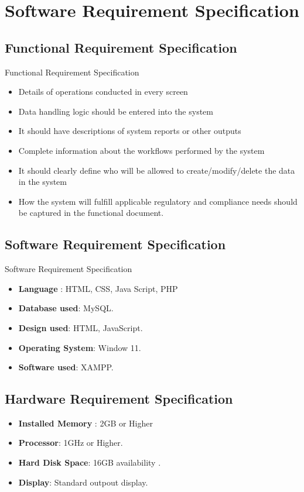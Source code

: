 \documentclass[12pt, letter paper]{report}
\begin{document}
{\chapter{Software Requirement Specification}

\section{Functional Requirement Specification} 
Functional  Requirement Specification
\begin{itemize}
\item Details of operations conducted in every screen
\item Data handling logic should be entered into the system
\item It should have descriptions of system reports or other outputs
\item Complete information about the workflows performed by the system
\item It should clearly define who will be allowed to create/modify/delete the data in the system
\item How the system will fulfill applicable regulatory and compliance needs should be captured in the functional document.
\end{itemize}
\section{Software Requirement Specification}
Software Requirement Specification
\begin{itemize}
 \item {\textbf{Language} : HTML, CSS, Java Script, PHP}
 \item {\textbf{Database used}: MySQL}.
 \item {\textbf{Design used}: HTML, JavaScript}.
 \item {\textbf{Operating System}: Window 11}.
 \item {\textbf{Software used}: XAMPP}.
\end{itemize}

\section{Hardware Requirement Specification} 

\begin{itemize}
 \item {\textbf{Installed Memory} : 2GB or Higher}
 \item {\textbf{Processor}: 1GHz or Higher}.
 \item {\textbf{Hard Disk Space}: 16GB availability }.
 \item {\textbf{Display}: Standard outpout display}.
 \
\end{itemize}
}
\end{document}
